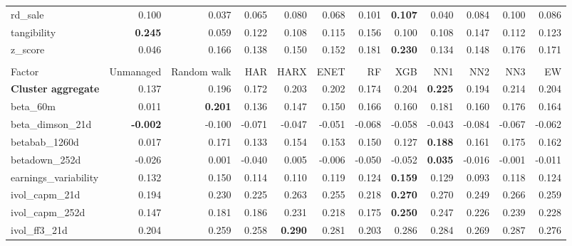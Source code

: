 \begin{landscape}
\begin{longtable}{>{\raggedright\arraybackslash}p{2.6cm}rrrrrrrrrrr}
rd\_sale & 0.100 & 0.037 & 0.065 & 0.080 & 0.068 & \cellcolor{blue!10}0.101 & \textbf{\cellcolor{blue!10}0.107} & 0.040 & 0.084 & 0.100 & 0.086 \\
tangibility & \textbf{0.245} & 0.059 & 0.122 & 0.108 & 0.115 & 0.156 & 0.100 & 0.108 & 0.147 & 0.112 & 0.123 \\
z\_score & 0.046 & 0.166 & 0.138 & 0.150 & 0.152 & \cellcolor{blue!10}0.181 & \textbf{\cellcolor{blue!10}0.230} & 0.134 & 0.148 & \cellcolor{blue!10}0.176 & \cellcolor{blue!10}0.171 \\
\hline
\multicolumn{12}{@{}l}{\textit{Panel E. Low Risk}} \\
\hline
Factor & Unmanaged & Random walk & HAR & HARX & ENET & RF & XGB & NN1 & NN2 & NN3 & EW \\
\hline
\textbf{Cluster aggregate} & 0.137 & 0.196 & 0.172 & \cellcolor{blue!10}0.203 & \cellcolor{blue!10}0.202 & 0.174 & \cellcolor{blue!10}0.204 & \textbf{\cellcolor{blue!10}0.225} & 0.194 & \cellcolor{blue!10}0.214 & \cellcolor{blue!10}0.204 \\
beta\_60m & 0.011 & \textbf{0.201} & 0.136 & 0.147 & 0.150 & 0.166 & 0.160 & 0.181 & 0.160 & 0.176 & 0.164 \\
beta\_dimson\_21d & \textbf{-0.002} & -0.100 & -0.071 & -0.047 & -0.051 & -0.068 & -0.058 & -0.043 & -0.084 & -0.067 & -0.062 \\
betabab\_1260d & 0.017 & 0.171 & 0.133 & 0.154 & 0.153 & 0.150 & 0.127 & \textbf{\cellcolor{blue!10}0.188} & 0.161 & \cellcolor{blue!10}0.175 & 0.162 \\
betadown\_252d & -0.026 & 0.001 & -0.040 & \cellcolor{blue!10}0.005 & -0.006 & -0.050 & -0.052 & \textbf{\cellcolor{blue!10}0.035} & -0.016 & -0.001 & -0.011 \\
earnings\_variability & 0.132 & 0.150 & 0.114 & 0.110 & 0.119 & 0.124 & \textbf{\cellcolor{blue!10}0.159} & 0.129 & 0.093 & 0.118 & 0.124 \\
ivol\_capm\_21d & 0.194 & 0.230 & 0.225 & \cellcolor{blue!10}0.263 & \cellcolor{blue!10}0.255 & 0.218 & \textbf{\cellcolor{blue!10}0.270} & \cellcolor{blue!10}0.270 & \cellcolor{blue!10}0.249 & \cellcolor{blue!10}0.266 & \cellcolor{blue!10}0.259 \\
ivol\_capm\_252d & 0.147 & 0.181 & \cellcolor{blue!10}0.186 & \cellcolor{blue!10}0.231 & \cellcolor{blue!10}0.218 & 0.175 & \textbf{\cellcolor{blue!10}0.250} & \cellcolor{blue!10}0.247 & \cellcolor{blue!10}0.226 & \cellcolor{blue!10}0.239 & \cellcolor{blue!10}0.228 \\
ivol\_ff3\_21d & 0.204 & 0.259 & 0.258 & \textbf{\cellcolor{blue!10}0.290} & \cellcolor{blue!10}0.281 & 0.203 & \cellcolor{blue!10}0.286 & \cellcolor{blue!10}0.284 & \cellcolor{blue!10}0.269 & \cellcolor{blue!10}0.287 & \cellcolor{blue!10}0.276 \\

\end{longtable}
\end{landscape}
